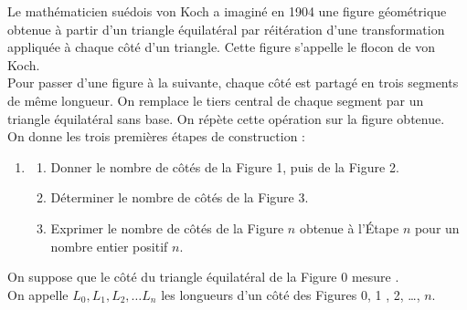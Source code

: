 \begin{exercice}[CRPE 2020 G7] %
   Le mathématicien suédois von Koch a imaginé en 1904 une figure géométrique obtenue à partir d’un triangle équilatéral par réitération d’une transformation appliquée à chaque côté d’un triangle. Cette figure s’appelle le flocon de von Koch. \\
   Pour passer d’une figure à la suivante, chaque côté est partagé en trois segments de même longueur. On remplace le tiers central de chaque segment par un triangle équilatéral sans base. On répète cette opération sur la figure obtenue. \\
   On donne les trois premières étapes de construction :
   \begin{center}
   \end{center}
   \begin{enumerate}
      \item
         \begin{enumerate}
            \item Donner le nombre de côtés de la Figure 1, puis de la Figure 2.
            \item Déterminer le nombre de côtés de la Figure 3.
            \item Exprimer le nombre de côtés de la Figure $n$ obtenue à l’Étape $n$ pour un nombre entier positif $n$.
         \end{enumerate}
   \end{enumerate}
   On suppose que le côté du triangle équilatéral de la Figure 0 mesure . \\
   On appelle $L_0 , L_1 , L_2 ,\dots L_n$ les longueurs d’un côté des Figures 0, 1 , 2, \dots, $n$. \\

\end{exercice}
